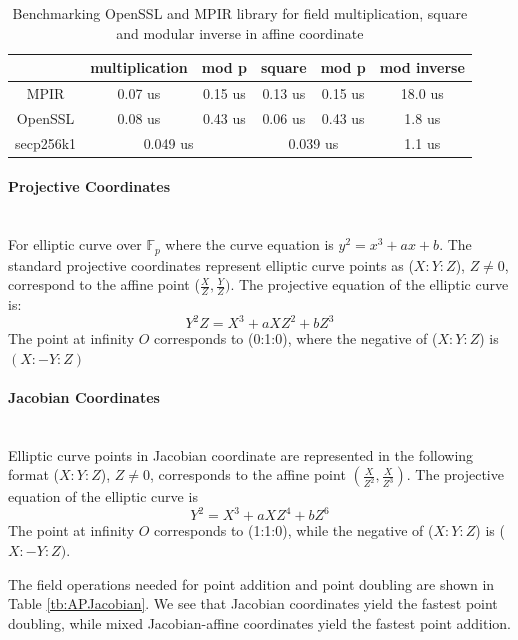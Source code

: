  \begin{table}[]
 	\centering
 	\caption{Benchmarking OpenSSL and MPIR library for field multiplication, square and modular inverse in affine coordinate}
 	\label{table:benchmark_msi_affine}
 	\begin{tabular}{|c|c|c|c|c|c|}
 		\hline
 		& multiplication     & mod p    & square         & mod p        & mod inverse \\ \hline
 		MPIR      & 0.07 us            & 0.15 us    & 0.13 us        & 0.15 us        & 18.0 us     \\ \hline
 		OpenSSL   & 0.08 us            & 0.43 us    & 0.06 us        & 0.43 us        & 1.8 us      \\ \hline
 		secp256k1 & \multicolumn{2}{c|}{0.049 us} & \multicolumn{2}{c|}{0.039 us} & 1.1 us      \\ \hline
 	\end{tabular}
 \end{table}

\paragraph{Projective Coordinates} \mbox{}\\
For elliptic curve over $\mathbb{F}_p$ where the curve equation is $y^2=x^3+ax+b$. The standard projective coordinates represent elliptic curve points as ($X:Y:Z$), $Z \neq 0$, correspond to the affine point ($\frac{X}{Z},\frac{Y}{Z})$. The projective equation of the elliptic curve is: $$Y^2Z=X^3+aXZ^2+bZ^3$$ The point at infinity $O$ corresponds to (0:1:0), where the negative of ($X:Y:Z$) is $(X:-Y:Z)$ 
\paragraph{Jacobian Coordinates} \mbox{}\\
Elliptic curve points in Jacobian coordinate are represented in the following format ($X:Y:Z$), $Z \neq 0$, corresponds to the affine point $(\frac{X}{Z^2},\frac{X}{Z^3})$. The projective equation of the elliptic curve is $$ Y^2=X^3+aXZ^4+bZ^6$$ The point at infinity $O$ corresponds to (1:1:0), while the negative of ($X:Y:Z$) is ($X:-Y:Z)$.
 
The field operations needed for point addition and point doubling are shown in Table \ref{tb:APJacobian}. We see that Jacobian coordinates yield the fastest point doubling, while mixed Jacobian-affine coordinates yield the fastest point addition.

